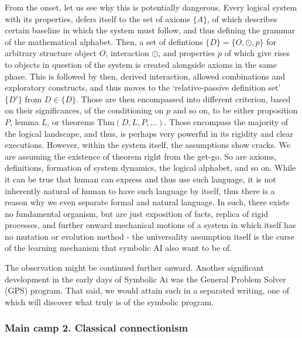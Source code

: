 From the onset, let us see why this is potentially dangerous. Every logical system with its properties, defers itself to the set of axioms $\{A\}$, of which describes certain baseline in which the system must follow, and thus defining the grammar of the mathematical alphabet. Then, a set of defintions $\{D\}=\{O,\odot, p\}$ for arbitrary structure object $O$, interaction $\odot$, and properties $p$ of which give rises to objects in question of the system is created alongside axioms in the same phase. This is followed by then, derived interaction, allowed combinations and exploratory constructs, and thus moves to the `relative-passive definition set' $\{D'\}$ from $D\in\{D\}$. Those are then encompassed into different criterion, based on their significances, of the conditioning on $p$ and so on, to be either proposition $P$, lemma $L$, or theorems $\mathrm{Thm}(D,L,P,\dots)$. Those encompass the majority of the logical landscape, and thus, is perhaps very powerful in its rigidity and clear executions. However, within the system itself, the assumptions show cracks. We are assuming the existence of theorem right from the get-go. So are axioms, definitions, formation of system dynamics, the logical alphabet, and so on. While it can be true that human can express and thus use such language, it is not inherently natural of human to have such language by itself, thus there is a reason why we even separate formal and natural language. In such, there exists no fundamental organism, but are just exposition of facts, replica of rigid processes, and further onward mechanical motions of a system in which itself has no mutation or evolution method - the universality assumption itself is the curse of the learning mechanism that symbolic AI also want to be of. 

The observation might be continued further onward. Another significant development in the early days of Symbolic Ai was the General Problem Solver (GPS) program. That said, we would attain such in a separated writing, one of which will discover what truly is of the symbolic program. 

\subsubsection{Main camp 2. Classical connectionism}

